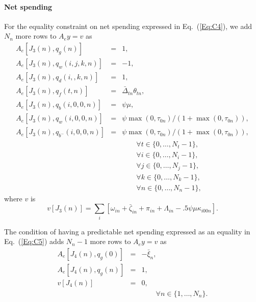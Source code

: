\documentclass{article}[fleqn,12pt]
\begin{document}
\paragraph*{Net spending}
For the equality constraint on net spending expressed in Eq.~(\ref{Eq:C4}),
we add $N_n$ more rows to $A_ey = v$ as
\begin{eqnarray}
	A_e[J_3(n), q_g(n)] &=& 1, \nonumber \\
	A_e[J_3(n), q_w(i, j ,k, n)] &=& -1,\nonumber \\
	A_e[J_3(n), q_d(i, ,k, n)] &=& 1, \nonumber \\
	A_e[J_3(n), q_f(t, n)] &=& \bar\Delta_{t n}\theta_{t n}, \nonumber \\
	A_e[J_3(n), q_b(i, 0, 0, n)] &=& \psi\mu, \nonumber \\
	A_e[J_3(n), q_w(i, 0, 0, n)] &=& \psi\max(0, \tau_{0n})/(1+\max(0, \tau_{0n})), \nonumber \\
	A_e[J_3(n), q_{b^-}(i, 0, 0, n)] &=& \psi\max(0, \tau_{0n})/(1+\max(0, \tau_{0n})), \\
	&&\qquad\forall t \in \{0,\ldots, N_t-1\},\nonumber\\
	&&\qquad\forall i \in \{0,\ldots, N_i-1\},\nonumber\\
	&&\qquad\forall j \in \{0,\ldots, N_j-1\},\nonumber\\
	&&\qquad\forall k \in \{0,\ldots, N_k-1\},\nonumber\\
	&&\qquad\forall n \in \{0,\ldots, N_n-1\}, \nonumber
\end{eqnarray}
where $v$ is
\begin{equation}
	v[J_3(n)] = \sum_i [\omega_{in} + \bar\zeta_{in} + \pi_{in}
	+ \Lambda_{in} - .5\psi\mu\kappa_{i00n}].
\end{equation}

The condition of having a predictable net spending expressed as an
equality in Eq.~(\ref{Eq:C5}) adds $N_n-1$ more rows to $A_ey = v$ as
\begin{eqnarray}
	A_e[J_4(n), q_g(0)] &=& -\bar{\xi}_n, \nonumber \\
	A_e[J_4(n), q_g(n)] &=& 1, \nonumber \\
	v[J_4(n)] &=& 0, \\
	&&\qquad\forall n \in \{1,\ldots, N_n\}. \nonumber
\end{eqnarray}
\end{document}
